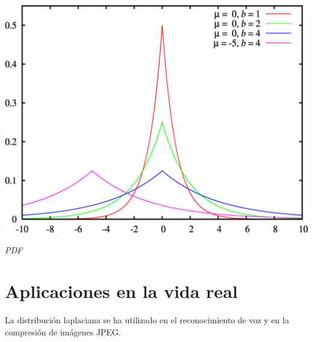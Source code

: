 \begin{center}
	\includegraphics[scale=0.3]{imgs/laplace-pdf.png}
	
	\textit{PDF}
\end{center}
	
\section{Aplicaciones en la vida real}
La distribución laplaciana se ha utilizado en el reconocimiento de voz y en la compresión de imágenes JPEG.